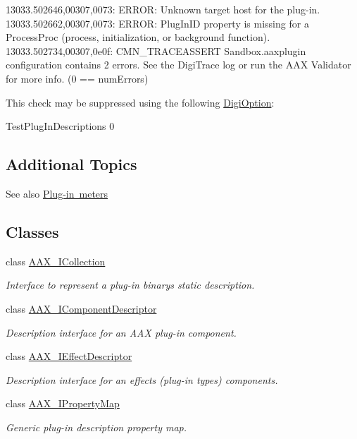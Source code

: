 \begin{DoxyVerb}13033.502646,00307,0073: ERROR: Unknown target host for the plug-in.
13033.502662,00307,0073: ERROR: PlugInID property is missing for a ProcessProc (process, initialization, or background function).
13033.502734,00307,0e0f: CMN_TRACEASSERT  Sandbox.aaxplugin configuration contains 2 errors. See the DigiTrace log or run the AAX Validator for more info. (0 == numErrors)\end{DoxyVerb}


 This check may be suppressed using the following \mbox{\hyperlink{a00830_aax_pro_tools_guide_06c_digioptions}{Digi\+Option}}\+:

 {\ttfamily Test\+Plug\+In\+Descriptions 0}



 \hypertarget{a00796_describe_additionaltopics}{}\subsection{Additional Topics}\label{a00796_describe_additionaltopics}
 \begin{DoxySeeAlso}{See also}
\mbox{\hyperlink{a00807}{Plug-\/in meters}}
\end{DoxySeeAlso}
 \subsection*{Classes}
\begin{DoxyCompactItemize}
\item 
class \mbox{\hyperlink{a01777}{A\+A\+X\+\_\+\+I\+Collection}}
\begin{DoxyCompactList}\small\item\em Interface to represent a plug-\/in binary\textquotesingle{}s static description. \end{DoxyCompactList}\item 
class \mbox{\hyperlink{a01781}{A\+A\+X\+\_\+\+I\+Component\+Descriptor}}
\begin{DoxyCompactList}\small\item\em Description interface for an A\+AX plug-\/in component. \end{DoxyCompactList}\item 
class \mbox{\hyperlink{a01813}{A\+A\+X\+\_\+\+I\+Effect\+Descriptor}}
\begin{DoxyCompactList}\small\item\em Description interface for an effect\textquotesingle{}s (plug-\/in type\textquotesingle{}s) components. \end{DoxyCompactList}\item 
class \mbox{\hyperlink{a01869}{A\+A\+X\+\_\+\+I\+Property\+Map}}
\begin{DoxyCompactList}\small\item\em Generic plug-\/in description property map. \end{DoxyCompactList}\end{DoxyCompactItemize}
